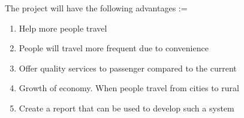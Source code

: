 
The project will have the following advantages :=

\begin{enumerate}
    \item Help more people travel
    \item People will travel more frequent due to convenience
    \item Offer quality services to passenger compared to the current
    \item Growth of economy. When people travel from cities to rural
    \item Create a report that can be used to develop such a system
\end{enumerate}